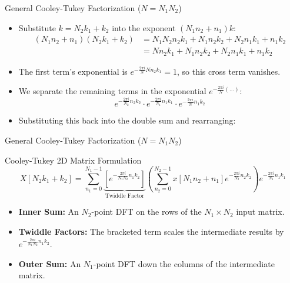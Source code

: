 \begin{frame}{General Cooley-Tukey Factorization ($N = N_1 N_2$)}
    \begin{itemize}
        \item Substitute $k = N_2 k_1 + k_2$ into the exponent $(N_1 n_2 + n_1)k$:
              \begin{align*}
                  (N_1 n_2 + n_1)(N_2 k_1 + k_2) & = N_1 N_2 n_2 k_1 + N_1 n_2 k_2 + N_2 n_1 k_1 + n_1 k_2 \\
                                                 & = N n_2 k_1 + N_1 n_2 k_2 + N_2 n_1 k_1 + n_1 k_2
              \end{align*}
        \item The first term's exponential is $e^{-\frac{2\pi i}{N} N n_2 k_1} = 1$, so this cross term vanishes.
        \item We separate the remaining terms in the exponential $e^{-\frac{2\pi i}{N}(\dots)}$:
              \begin{equation*}
                  e^{-\frac{2\pi i}{N_2} n_2 k_2} \cdot e^{-\frac{2\pi i}{N_1} n_1 k_1} \cdot e^{-\frac{2\pi i}{N} n_1 k_2}
              \end{equation*}
        \item Substituting this back into the double sum and rearranging:
    \end{itemize}
\end{frame}

\begin{frame}{General Cooley-Tukey Factorization ($N = N_1 N_2$)}
    \begin{conceptbox}{Cooley-Tukey 2D Matrix Formulation}
        \begin{equation*}
            X[{N_2 k_1 + k_2}] = \sum_{n_1=0}^{N_1-1} \underbrace{\left[ e^{-\frac{2\pi i}{N_1 N_2} n_1 k_2} \right]}_{\text{Twiddle Factor}} \left( \sum_{n_2=0}^{N_2-1} x[{N_1 n_2 + n_1}] e^{-\frac{2\pi i}{N_2} n_2 k_2} \right) e^{-\frac{2\pi i}{N_1} n_1 k_1}
        \end{equation*}
    \end{conceptbox}
    \vspace{0.2cm}
    \begin{itemize}
        \item \textbf{Inner Sum:} An $N_2$-point DFT on the rows of the $N_1 \times N_2$ input matrix.
        \item \textbf{Twiddle Factors:} The bracketed term scales the intermediate results by $e^{-\frac{2\pi i}{N_1 N_2} n_1 k_2}$.
        \item \textbf{Outer Sum:} An $N_1$-point DFT down the columns of the intermediate matrix.
    \end{itemize}
\end{frame}

